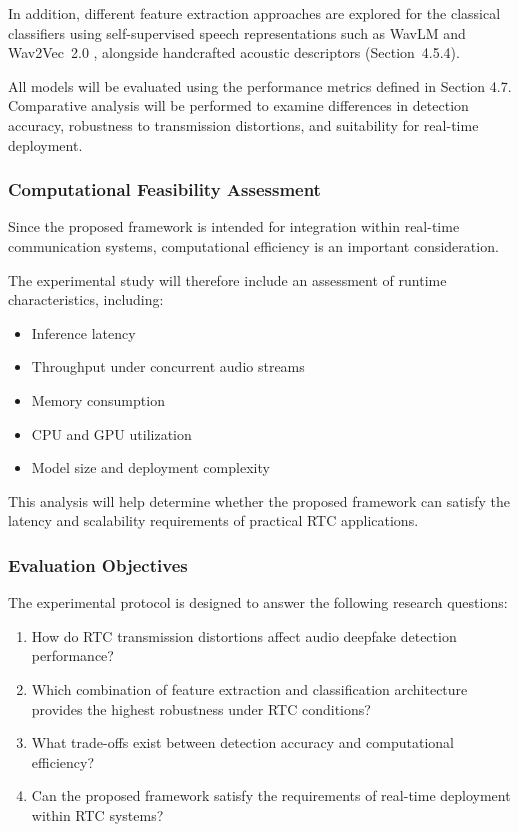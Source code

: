 In addition, different feature extraction approaches are explored for the classical classifiers using self-supervised speech representations such as WavLM \cite{Chen2022_wavlm} and Wav2Vec~2.0 \cite{Baevski2020_wav2vec2}, alongside handcrafted acoustic descriptors (Section~4.5.4).

All models will be evaluated using the performance metrics defined in Section 4.7. Comparative analysis will be performed to examine differences in detection accuracy, robustness to transmission distortions, and suitability for real-time deployment.

\subsubsection{Computational Feasibility Assessment}

Since the proposed framework is intended for integration within real-time communication systems, computational efficiency is an important consideration.

The experimental study will therefore include an assessment of runtime characteristics, including:

\begin{itemize}
\item Inference latency
\item Throughput under concurrent audio streams
\item Memory consumption
\item CPU and GPU utilization
\item Model size and deployment complexity
\end{itemize}

This analysis will help determine whether the proposed framework can satisfy the latency and scalability requirements of practical RTC applications.

\subsubsection{Evaluation Objectives}

The experimental protocol is designed to answer the following research questions:
\vspace{-0.5cm}
\begin{enumerate}[label=\textbf{\arabic*.}]
\item How do RTC transmission distortions affect audio deepfake detection performance?
\item Which combination of feature extraction and classification architecture provides the highest robustness under RTC conditions?
\item What trade-offs exist between detection accuracy and computational efficiency?
\item Can the proposed framework satisfy the requirements of real-time deployment within RTC systems?

\end{enumerate}
